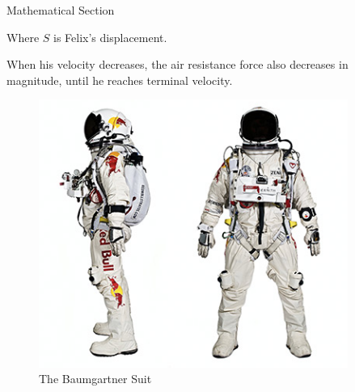 \documentclass[final]{beamer}
\newlength{\sepwid}
\newlength{\onecolwid}
\newlength{\twocolwid}
\begin{document}
\begin{frame}
\begin{columns}[t]
\begin{column}{\twocolwid}
\begin{columns}[t,totalwidth=\twocolwid]
\begin{column}{\onecolwid}
\begin{exampleblock}{Mathematical Section}
\par Where $S$ is Felix's displacement.
\par When his velocity decreases, the air resistance force also decreases in magnitude, until he reaches terminal velocity.
\newline
\begin{figure}
    \centering
    \includegraphics[scale=2.0]{img/baumgartner_suit.PNG}
    \caption{The Baumgartner Suit}
    \label{fig:my_label}
\end{figure}
 
\end{exampleblock}

\end{column} %
\begin{column}{\sepwid}\end{column} %

\begin{column}{\onecolwid}\vspace{-.74in} %



\end{column}
\end{columns}
\end{column}
\end{columns}
\end{frame}
\end{document}
